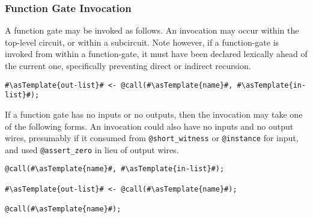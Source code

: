 \subsubsection*{Function Gate Invocation}\label{function_invoke_overview}
A function gate may be invoked as follows.
An invocation may occur within the top-level circuit, or within a subcircuit.
Note however, if a function-gate is invoked from within a function-gate, it must have been declared lexically ahead of the current one, specifically preventing direct or indirect recursion.\\

\begin{lstlisting}
#\asTemplate{out-list}# <- @call(#\asTemplate{name}#, #\asTemplate{in-list}#);
\end{lstlisting}

If a function gate has no inputs or no outputs, then the invocation may take one of the following forms.
An invocation could also have no inputs and no output wires, presumably if it consumed from \texttt{@short\_witness} or \texttt{@instance} for input, and used \texttt{@assert\_zero} in lieu of output wires.\\

\begin{lstlisting}
@call(#\asTemplate{name}#, #\asTemplate{in-list}#);

#\asTemplate{out-list}# <- @call(#\asTemplate{name}#);

@call(#\asTemplate{name}#);
\end{lstlisting}

